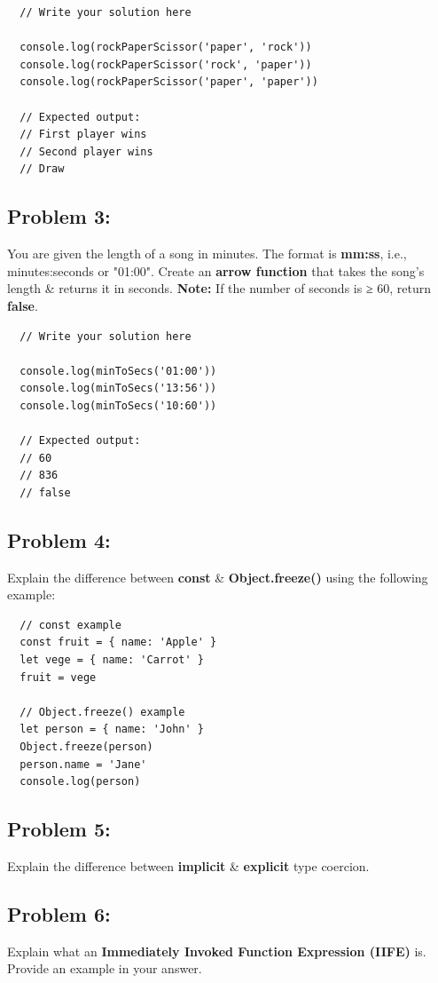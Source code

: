 \documentclass{article}
\begin{document}
\begin{verbatim}
  // Write your solution here

  console.log(rockPaperScissor('paper', 'rock'))
  console.log(rockPaperScissor('rock', 'paper'))
  console.log(rockPaperScissor('paper', 'paper'))

  // Expected output:
  // First player wins
  // Second player wins
  // Draw
\end{verbatim}

\subsection*{Problem 3:}
You are given the length of a song in minutes. The format is \textbf{mm:ss}, i.e., minutes:seconds or "01:00". Create an \textbf{arrow function} that takes the song's length \& returns it in seconds. \textbf{Note:} If the number of seconds is ≥ 60, return \textbf{false}.

\begin{verbatim}
  // Write your solution here

  console.log(minToSecs('01:00'))
  console.log(minToSecs('13:56'))
  console.log(minToSecs('10:60'))

  // Expected output:
  // 60
  // 836
  // false
\end{verbatim}

\subsection*{Problem 4:}
Explain the difference between \textbf{const} \& \textbf{Object.freeze()} using the following example:

\begin{verbatim}
  // const example
  const fruit = { name: 'Apple' }
  let vege = { name: 'Carrot' }
  fruit = vege

  // Object.freeze() example
  let person = { name: 'John' }
  Object.freeze(person)
  person.name = 'Jane'
  console.log(person)
\end{verbatim}

\subsection*{Problem 5:}
Explain the difference between \textbf{implicit} \& \textbf{explicit} type coercion.

\subsection*{Problem 6:} 
Explain what an \textbf{Immediately Invoked Function Expression (IIFE)} is. Provide an example in your answer.
\end{document}
